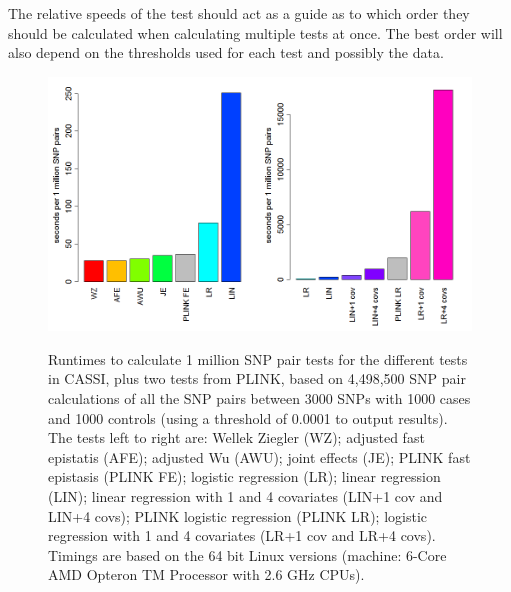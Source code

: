 \documentclass[a4paper,12pt]{article}
\begin{document}
The relative speeds of the test should act as a guide as to which order they should be calculated when calculating multiple tests at once. The best order will also depend on the thresholds used for each test and possibly the data. 
{\begin{figure}[ht]
{\begin{center}
{\includegraphics[width=400pt]{runtimesCASSI2.png}}
\caption{Runtimes to calculate 1 million SNP pair tests for the different tests in CASSI, plus two tests from PLINK, based on 4,498,500 SNP pair calculations of all the SNP pairs between 3000 SNPs with 1000 cases and 1000 controls (using a threshold of 0.0001 to output results). The tests left to right are: Wellek Ziegler (WZ); adjusted fast epistatis (AFE); adjusted Wu (AWU); joint effects (JE); PLINK fast epistasis (PLINK FE); logistic regression (LR); linear regression (LIN); linear regression with 1 and 4 covariates (LIN+1 cov and LIN+4 covs); PLINK logistic regression (PLINK LR); logistic regression with 1 and 4 covariates (LR+1 cov and LR+4 covs). Timings are based on the 64 bit Linux versions (machine: 6-Core AMD Opteron TM Processor with 2.6 GHz CPUs).}
\label{runtimes-fig}
\end{center}}
\end{figure}
}






\end{document}
